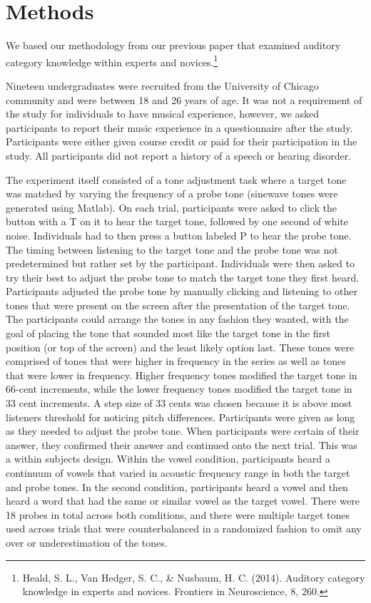\documentclass[
  man,floatsintext]{apa6}
\begin{document}
\hypertarget{methods}{%
\section{Methods}\label{methods}}

We based our methodology from our previous paper that examined auditory category knowledge within experts and novices.\footnote{Heald, S. L., Van Hedger, S. C., \& Nusbaum, H. C. (2014). Auditory category knowledge in experts and novices. Frontiers in Neuroscience, 8, 260.}

Nineteen undergraduates were recruited from the University of Chicago community and were between 18 and 26 years of age. It was not a requirement of the study for individuals to have musical experience, however, we asked participants to report their music experience in a questionnaire after the study. Participants were either given course credit or paid for their participation in the study. All participants did not report a history of a speech or hearing disorder.

The experiment itself consisted of a tone adjustment task where a target tone was matched by varying the frequency of a probe tone (sinewave tones were generated using Matlab). On each trial, participants were asked to click the button with a T on it to hear the target tone, followed by one second of white noise. Individuals had to then press a button labeled P to hear the probe tone. The timing between listening to the target tone and the probe tone was not predetermined but rather set by the participant. Individuals were then asked to try their best to adjust the probe tone to match the target tone they first heard. Participants adjusted the probe tone by manually clicking and listening to other tones that were present on the screen after the presentation of the target tone. The participants could arrange the tones in any fashion they wanted, with the goal of placing the tone that sounded most like the target tone in the first position (or top of the screen) and the least likely option last. These tones were comprised of tones that were higher in frequency in the series as well as tones that were lower in frequency. Higher frequency tones modified the target tone in 66-cent increments, while the lower frequency tones modified the target tone in 33 cent increments. A step size of 33 cents was chosen because it is above most listeners threshold for noticing pitch differences. Participants were given as long as they needed to adjust the probe tone. When participants were certain of their answer, they confirmed their answer and continued onto the next trial. This was a within subjects design. Within the vowel condition, participants heard a continuum of vowels that varied in acoustic frequency range in both the target and probe tones. In the second condition, participants heard a vowel and then heard a word that had the same or similar vowel as the target vowel. There were 18 probes in total across both conditions, and there were multiple target tones used across trials that were counterbalanced in a randomized fashion to omit any over or underestimation of the tones.
\end{document}
